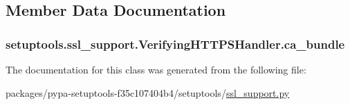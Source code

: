 \subsection{Member Data Documentation}
\hypertarget{classsetuptools_1_1ssl__support_1_1VerifyingHTTPSHandler_a7b26fd0669813cfb616c35bd285a2efd}{}
\subsubsection[{ca\+\_\+bundle}]{\setlength{\rightskip}{0pt plus 5cm}setuptools.\+ssl\+\_\+support.\+Verifying\+H\+T\+T\+P\+S\+Handler.\+ca\+\_\+bundle}\label{classsetuptools_1_1ssl__support_1_1VerifyingHTTPSHandler_a7b26fd0669813cfb616c35bd285a2efd}


The documentation for this class was generated from the following file\+:\begin{DoxyCompactItemize}
\item 
packages/pypa-\/setuptools-\/f35c107404b4/setuptools/\hyperlink{ssl__support_8py}{ssl\+\_\+support.\+py}\end{DoxyCompactItemize}
